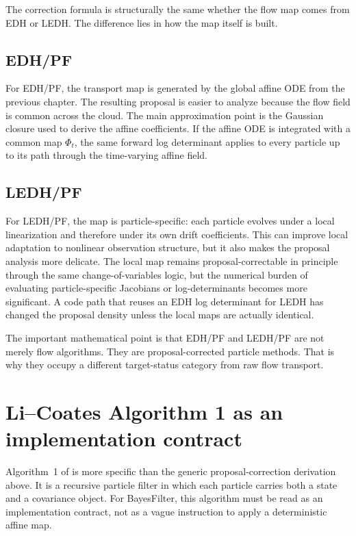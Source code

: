 The correction formula is structurally the same whether the flow map comes from
EDH or LEDH.  The difference lies in how the map itself is built.

\subsection{EDH/PF}

For EDH/PF, the transport map is generated by the global affine ODE from the
previous chapter.  The resulting proposal is easier to analyze because the flow
field is common across the cloud.  The main approximation point is the Gaussian
closure used to derive the affine coefficients.  If the affine ODE is integrated
with a common map $\Phi_t$, the same forward log determinant applies to every
particle up to its path through the time-varying affine field.

\subsection{LEDH/PF}

For LEDH/PF, the map is particle-specific: each particle evolves under a local
linearization and therefore under its own drift coefficients.  This can improve
local adaptation to nonlinear observation structure, but it also makes the
proposal analysis more delicate.  The local map remains proposal-correctable in
principle through the same change-of-variables logic, but the numerical burden
of evaluating particle-specific Jacobians or log-determinants becomes more
significant.  A code path that reuses an EDH log determinant for LEDH has
changed the proposal density unless the local maps are actually identical.

The important mathematical point is that EDH/PF and LEDH/PF are not merely flow
algorithms.  They are proposal-corrected particle methods.  That is why they
occupy a different target-status category from raw flow transport.

\section{Li--Coates Algorithm 1 as an implementation contract}
\label{sec:bf-pfpf-li-coates-algorithm-contract}

Algorithm~1 of \citet{li2017particle} is more specific than the generic
proposal-correction derivation above.  It is a recursive particle filter in
which each particle carries both a state and a covariance object.  For
BayesFilter, this algorithm must be read as an implementation contract, not as
a vague instruction to apply a deterministic affine map.

